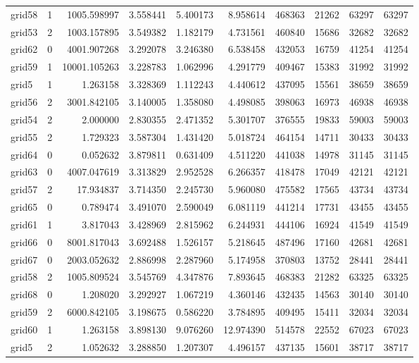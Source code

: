 \documentclass[../../../thesis.tex]{subfiles}
\begin{document}
\begin{longtable}{|l|r|r|r|r|r|r|r|r|r|}
grid58 & 1 & 1005.598997 & 3.558441 & 5.400173 & 8.958614 & 468363 & 21262 & 63297 & 63297 \\
grid53 & 2 & 1003.157895 & 3.549382 & 1.182179 & 4.731561 & 460840 & 15686 & 32682 & 32682 \\
grid62 & 0 & 4001.907268 & 3.292078 & 3.246380 & 6.538458 & 432053 & 16759 & 41254 & 41254 \\
grid59 & 1 & 10001.105263 & 3.228783 & 1.062996 & 4.291779 & 409467 & 15383 & 31992 & 31992 \\
grid5 & 1 & 1.263158 & 3.328369 & 1.112243 & 4.440612 & 437095 & 15561 & 38659 & 38659 \\
grid56 & 2 & 3001.842105 & 3.140005 & 1.358080 & 4.498085 & 398063 & 16973 & 46938 & 46938 \\
grid54 & 2 & 2.000000 & 2.830355 & 2.471352 & 5.301707 & 376555 & 19833 & 59003 & 59003 \\
grid55 & 2 & 1.729323 & 3.587304 & 1.431420 & 5.018724 & 464154 & 14711 & 30433 & 30433 \\
grid64 & 0 & 0.052632 & 3.879811 & 0.631409 & 4.511220 & 441038 & 14978 & 31145 & 31145 \\
grid63 & 0 & 4007.047619 & 3.313829 & 2.952528 & 6.266357 & 418478 & 17049 & 42121 & 42121 \\
grid57 & 2 & 17.934837 & 3.714350 & 2.245730 & 5.960080 & 475582 & 17565 & 43734 & 43734 \\
grid65 & 0 & 0.789474 & 3.491070 & 2.590049 & 6.081119 & 441214 & 17731 & 43455 & 43455 \\
grid61 & 1 & 3.817043 & 3.428969 & 2.815962 & 6.244931 & 444106 & 16924 & 41549 & 41549 \\
grid66 & 0 & 8001.817043 & 3.692488 & 1.526157 & 5.218645 & 487496 & 17160 & 42681 & 42681 \\
grid67 & 0 & 2003.052632 & 2.886998 & 2.287960 & 5.174958 & 370803 & 13752 & 28441 & 28441 \\
grid58 & 2 & 1005.809524 & 3.545769 & 4.347876 & 7.893645 & 468383 & 21282 & 63325 & 63325 \\
grid68 & 0 & 1.208020 & 3.292927 & 1.067219 & 4.360146 & 432435 & 14563 & 30140 & 30140 \\
grid59 & 2 & 6000.842105 & 3.198675 & 0.586220 & 3.784895 & 409495 & 15411 & 32034 & 32034 \\
grid60 & 1 & 1.263158 & 3.898130 & 9.076260 & 12.974390 & 514578 & 22552 & 67023 & 67023 \\
grid5 & 2 & 1.052632 & 3.288850 & 1.207307 & 4.496157 & 437135 & 15601 & 38717 & 38717 \\

\end{longtable}
\end{document}
